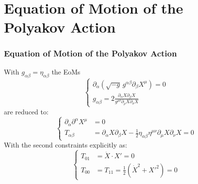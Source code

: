 \documentclass[aspectratio=169]{beamer}
\begin{document}
	\section{Equation of Motion of the Polyakov Action}

	\begin{frame}
		\frametitle{Equation of Motion of the Polyakov Action}
		With $g_{\alpha\beta} = \eta_{\alpha\beta}$ the EoMs
		\begin{equation*}
			\begin{cases}
				\partial_\alpha\left(\sqrt{-g}\,g^{\alpha\beta}\partial_\beta X^{\mu}\right) = 0 \\
				g_{\alpha\beta} =  2 \frac{\partial_\alpha X \partial_\beta X}{g^{\rho\sigma}\partial_\rho X \partial_\sigma X}
			\end{cases}
		\end{equation*}
		are reduced to:
		\begin{equation*}
			\begin{cases}
				\partial_\alpha\partial^\alpha X^{\mu} & = 0 \\
				T_{\alpha\beta} &= \partial_\alpha X \partial_\beta X - \frac{1}{2} \eta_{\alpha\beta} \eta^{\mu\nu} \partial_\mu X \partial_\nu X = 0
			\end{cases}
		\end{equation*}
		With the second constraints explicitly as:
		\begin{equation*}
			\begin{cases}
			T_{01} &= \dot{X}\cdot X' = 0 \\
			T_{00} &= T_{11} = \frac{1}{2} \left(\dot{X}^2 + X'^2 \right) = 0
			\end{cases}
		\end{equation*}
	\end{frame}	
\end{document}
